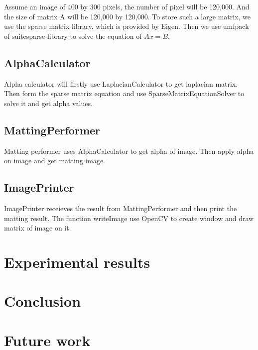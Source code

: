 \documentclass[11pt,letterpaper]{article}
\begin{document}
Assume an image of 400 by 300 pixels, the number of pixel will be 120,000. And the size of matrix A will be 120,000 by 120,000. To store such a large matrix, we use the sparse matrix library, which is provided by Eigen. Then we use umfpack of suitesparse library to solve the equation of $Ax=B$. \\

\subsection{AlphaCalculator}
Alpha calculator will firstly use LaplacianCalculator to get laplacian matrix. Then form the sparse matrix equation and use SparseMatrixEquationSolver to solve it and get alpha values.

\subsection{MattingPerformer}
Matting performer uses AlphaCalculator to get alpha of image. Then apply alpha on image and get matting image.

\subsection{ImagePrinter}
ImagePrinter receieves the result from MattingPerformer and then print the matting result. The function writeImage use OpenCV to create window and draw matrix of image on it. 

\section{Experimental results}
\section{Conclusion}
\section{Future work}


\end{document}
